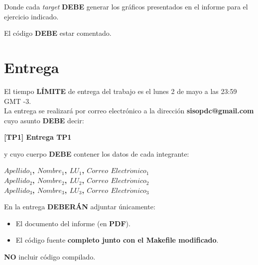 \documentclass[a4paper,11pt]{article}
\begin{document}
Donde cada \textit{target} \textbf{DEBE} generar los gráficos presentados en
el informe para el ejercicio indicado.

El código \textbf{DEBE} estar comentado.

\section*{Entrega}

El tiempo \textbf{LÍMITE} de entrega del trabajo es el lunes 2 de
mayo a las 23:59 GMT -3.\\

La entrega se realizará por correo electrónico a la dirección
\textbf{sisopdc@gmail.com} cuyo asunto \textbf{DEBE} decir:

\begin{center}
    \textbf{[TP1] Entrega TP1}
\end{center}

y cuyo cuerpo \textbf{DEBE} contener los datos de cada integrante:

\begin{center}
    \textbf{$Apellido_1$, $Nombre_1$, $LU_1$, $Correo$ $Electr\acute{o}nico_1$}\\
    \textbf{$Apellido_2$, $Nombre_2$, $LU_2$, $Correo$ $Electr\acute{o}nico_2$}\\
    \textbf{$Apellido_3$, $Nombre_3$, $LU_3$, $Correo$ $Electr\acute{o}nico_3$}\\
\end{center}

En la entrega \textbf{DEBERÁN} adjuntar únicamente:

\begin{itemize}
    \item El documento del informe (en \textbf{PDF}).

    \item El código fuente \textbf{completo junto con el Makefile modificado}.
\end{itemize}

\textbf{NO} incluir código compilado.
\end{document}

